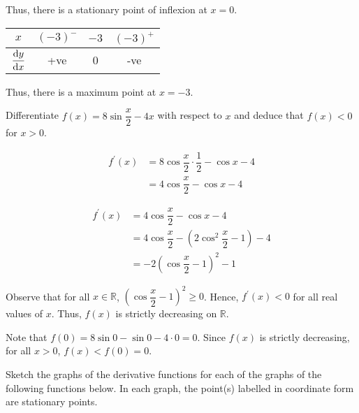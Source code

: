 \documentclass{echw}
\begin{document}
        Thus, there is a stationary point of inflexion at $x = 0$.

        \begin{table}[h]
            \centering
            \begin{tabular}{|c|c|c|c|}
            \hline
            $x$          & $(-3)^-$ & $-3$ & $(-3)^+$ \\\hline
            $\dfrac{\mathrm{d} y}{\mathrm{d} x}$ & +ve   & 0 & -ve   \\[1ex]\hline
            \end{tabular}
        \end{table}

        Thus, there is a maximum point at $x=-3$.


    \problem{}
        Differentiate $f(x) = 8\sin \dfrac{x}2 - 4x$ with respect to $x$ and deduce that $f(x) < 0$ for $x>0$.

    \solution
        \begin{align*}
            f^\prime(x) &= 8\cos \dfrac{x}2 \cdot \dfrac12 - \cos x - 4\\
            &= 4\cos\dfrac{x}2 - \cos x- 4
        \end{align*}


        \begin{align*}
            f^\prime(x) &= 4\cos\dfrac{x}2 - \cos x- 4\\
            &= 4\cos \dfrac{x}2 - (2\cos^2 \dfrac{x}2 - 1) - 4\\
            &= -2\left(\cos\dfrac{x}2 - 1\right)^2 - 1
        \end{align*}

        Observe that for all $x \in \mathbb{R}$, $\left(\cos\dfrac{x}2 - 1\right)^2 \geq 0$. Hence, $f^\prime(x) < 0$ for all real values of $x$. Thus, $f(x)$ is strictly decreasing on $\mathbb{R}$.

        Note that $f(0) = 8\sin 0 - \sin 0 - 4 \cdot 0 = 0$. Since $f(x)$ is strictly decreasing, for all $x > 0$, $f(x) < f(0) = 0$.

    \problem{}
        Sketch the graphs of the derivative functions for each of the graphs of the following functions below. In each graph, the point(s) labelled in coordinate form are stationary points.
\end{document}
